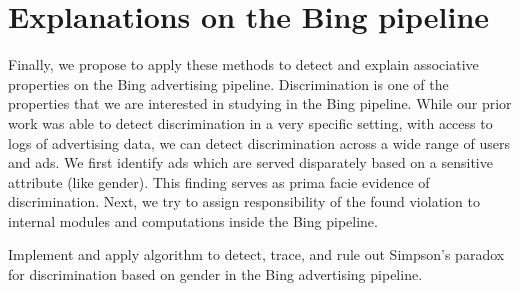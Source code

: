 \documentclass[10pt, onecolumn]{report}
\begin{document}
%


\section{Explanations on the Bing pipeline}

Finally, we propose to apply these methods to detect and explain associative
properties on the Bing advertising pipeline. 
Discrimination is
one of the properties that we are interested in studying in the Bing pipeline. 
While our prior work was able to detect discrimination in a very specific setting, 
with access to logs of advertising data, we can detect discrimination across 
a wide range of users and ads. 
We first identify ads which are served disparately based on a sensitive
attribute (like gender). This finding serves as prima facie evidence of discrimination. 
Next, we try to assign responsibility of the found violation to internal modules and 
computations inside the Bing pipeline. 

\begin{task}\label{task:bing}
Implement and apply algorithm to detect, trace, and rule out Simpson's paradox
for discrimination based on gender in the Bing advertising pipeline.
\end{task}
\end{document}
